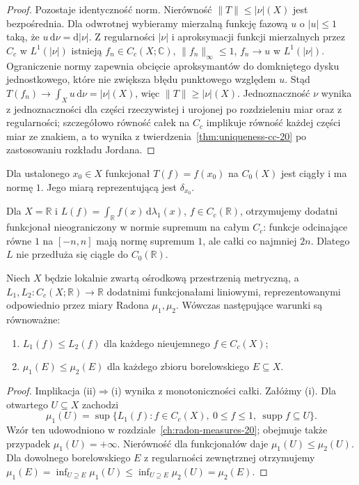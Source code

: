 \begin{proof}
Pozostaje identyczność norm. Nierówność
$\|T\|\le|\nu|(X)$ jest bezpośrednia. Dla odwrotnej
wybieramy mierzalną funkcję fazową $u$ o $|u|\le1$
taką, że $u\,\mathrm d\nu=\mathrm d|\nu|$.
Z regularności $|\nu|$ i aproksymacji funkcji
mierzalnych przez $C_c$ w $L^1(|\nu|)$ istnieją
$f_n\in C_c(X;\mathbb C)$, $\|f_n\|_\infty\le1$,
$f_n\to u$ w $L^1(|\nu|)$. Ograniczenie normy
zapewnia obcięcie aproksymantów do domkniętego
dysku jednostkowego, które nie zwiększa błędu
punktowego względem $u$. Stąd
$T(f_n)\to\int_Xu\,\mathrm d\nu=|\nu|(X)$,
więc $\|T\|\ge|\nu|(X)$.
Jednoznaczność $\nu$ wynika z jednoznaczności dla
części rzeczywistej i urojonej po rozdzieleniu miar
oraz z regularności; szczegółowo równość całek na
$C_c$ implikuje równość każdej części miar ze znakiem,
a to wynika z twierdzenia~\ref{thm:uniqueness-cc-20}
po zastosowaniu rozkładu Jordana.
\end{proof}

\begin{przyklad}
Dla ustalonego $x_0\in X$ funkcjonał $T(f)=f(x_0)$
na $C_0(X)$ jest ciągły i ma normę $1$.
Jego miarą reprezentującą jest $\delta_{x_0}$.
\end{przyklad}

\begin{przyklad}
Dla $X=\mathbb R$ i $L(f)=\int_{\mathbb R} f(x)
\,\mathrm d\lambda_1(x)$, $f\in C_c(\mathbb R)$,
otrzymujemy dodatni funkcjonał nieograniczony w normie
supremum na całym $C_c$: funkcje odcinające równe $1$
na $[-n,n]$ mają normę supremum $1$, ale całki
co najmniej $2n$. Dlatego $L$ nie przedłuża się
ciągle do $C_0(\mathbb R)$.
\end{przyklad}

\begin{wniosek}
\label{cor:riesz-order-21}
Niech $X$ będzie lokalnie zwartą ośrodkową przestrzenią
metryczną, a $L_1,L_2:C_c(X;\mathbb R)\to\mathbb R$
dodatnimi funkcjonałami liniowymi, reprezentowanymi
odpowiednio przez miary Radona $\mu_1,\mu_2$.
Wówczas następujące warunki są równoważne:
\begin{enumerate}[label=(\roman*)]
\item $L_1(f)\le L_2(f)$ dla każdego nieujemnego $f\in C_c(X)$;
\item $\mu_1(E)\le\mu_2(E)$ dla każdego zbioru borelowskiego
$E\subseteq X$.
\end{enumerate}
\end{wniosek}
\begin{proof}
Implikacja (ii)$\Rightarrow$(i) wynika z monotoniczności całki.
Załóżmy (i). Dla otwartego $U\subseteq X$ zachodzi
\[
 \mu_1(U)=\sup\{L_1(f):f\in C_c(X),\ 0\le f\le1,
 \ \operatorname{supp}f\subseteq U\}.
\]
Wzór ten udowodniono w rozdziale~\ref{ch:radon-measures-20};
obejmuje także przypadek $\mu_1(U)=+\infty$.
Nierówność dla funkcjonałów daje
$\mu_1(U)\le\mu_2(U)$. Dla dowolnego borelowskiego
$E$ z regularności zewnętrznej otrzymujemy
$\mu_1(E)=\inf_{U\supseteq E}\mu_1(U)
\le\inf_{U\supseteq E}\mu_2(U)=\mu_2(E)$.
\end{proof}


